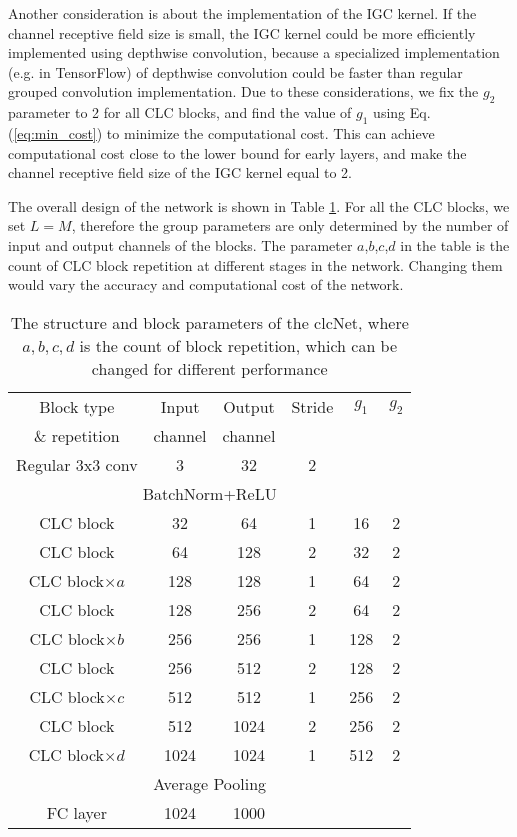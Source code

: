\documentclass[10pt,twocolumn,letterpaper]{article}
\begin{document}
Another consideration is about the implementation of the IGC kernel. If the channel receptive field size is small, the IGC kernel could be more efficiently implemented using depthwise convolution, because a specialized implementation (e.g. in TensorFlow) of depthwise convolution could be faster than regular grouped convolution implementation. Due to these considerations, we fix the $g_2$ parameter to 2 for all CLC blocks, and find the value of $g_1$ using Eq.(\ref{eq:min_cost}) to minimize the computational cost. This can achieve computational cost close to the lower bound for early layers, and make the channel receptive field size of the IGC kernel equal to 2.

The overall design of the network is shown in Table \ref{tb:clcnet}. For all the CLC blocks, we set $L=M$, therefore the group parameters are only determined by the number of input and output channels of the blocks. The parameter $a$,$b$,$c$,$d$ in the table is the count of CLC block repetition at different stages in the network. Changing them would vary the accuracy and computational cost of the network.

\begin{table}[h!]\footnotesize
\begin{center}
\begin{tabular}{|c||c|c|c||c|c|}
\hline
Block type & Input & Output  & Stride & $g_1$  & $g_2$  \\
\& repetition & channel & channel & &   &   \\
\hline\hline
Regular 3x3 conv & 3 & 32 & 2 &   &   \\
\hline
\multicolumn{6}{|c|}{BatchNorm+ReLU}\\
\hline
CLC block & 32 & 64 & 1 & 16  & 2  \\
\hline\hline
CLC block & 64 & 128 & 2 & 32  & 2  \\
\hline
CLC block$\times{a}$ & 128 & 128 & 1 & 64  & 2  \\
\hline\hline
CLC block & 128 & 256 & 2 & 64  & 2  \\
\hline
CLC block$\times{b}$ & 256 & 256 & 1 & 128  & 2  \\
\hline\hline
CLC block & 256 & 512 & 2 & 128  & 2  \\
\hline
CLC block$\times{c}$ & 512 & 512 & 1 & 256  & 2  \\
\hline\hline
CLC block & 512 & 1024 & 2 & 256  & 2  \\
\hline
CLC block$\times{d}$& 1024 & 1024 & 1 & 512  & 2  \\
\hline
\multicolumn{6}{|c|}{Average Pooling}\\
\hline
FC layer & 1024  & 1000  &  &   &   \\
\hline
\end{tabular}
\end{center}
\caption{The structure and block parameters of the clcNet, where $a,b,c,d$ is the count of block repetition, which can be changed for different performance}
\label{tb:clcnet}
\end{table}
\end{document}
